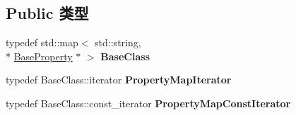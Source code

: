 \subsection*{Public 类型}
\begin{DoxyCompactItemize}
\item 
\hypertarget{classg2o_1_1PropertyMap_ac57ddbe51d16070e697fe314889fee03}{typedef std\-::map$<$ std\-::string, \\*
\hyperlink{classg2o_1_1BaseProperty}{Base\-Property} $\ast$ $>$ {\bfseries Base\-Class}}\label{classg2o_1_1PropertyMap_ac57ddbe51d16070e697fe314889fee03}

\item 
\hypertarget{classg2o_1_1PropertyMap_af5dd0defe4a5096f0d5602b38e837a78}{typedef Base\-Class\-::iterator {\bfseries Property\-Map\-Iterator}}\label{classg2o_1_1PropertyMap_af5dd0defe4a5096f0d5602b38e837a78}

\item 
\hypertarget{classg2o_1_1PropertyMap_af09ea140ab099b1762e9634b7fdcaf52}{typedef Base\-Class\-::const\-\_\-iterator {\bfseries Property\-Map\-Const\-Iterator}}\label{classg2o_1_1PropertyMap_af09ea140ab099b1762e9634b7fdcaf52}

\end{DoxyCompactItemize}
